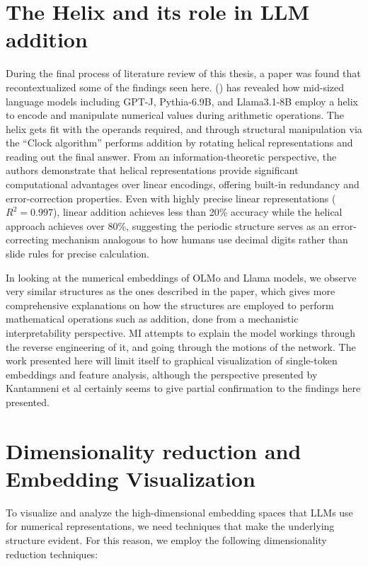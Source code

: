 \documentclass[
  a4paper, twoside, 10pt, titlepage]{book}
\begin{document}
\section{The Helix and its role in LLM
addition}\label{the-helix-and-its-role-in-llm-addition}

During the final process of literature review of this thesis, a paper
was found that recontextualized some of the findings seen here.
() has
revealed how mid-sized language models including GPT-J, Pythia-6.9B, and
Llama3.1-8B employ a helix to encode and manipulate numerical values
during arithmetic operations. The helix gets fit with the operands
required, and through structural manipulation via the ``Clock
algorithm'' performs addition by rotating helical representations and
reading out the final answer. From an information-theoretic perspective,
the authors demonstrate that helical representations provide significant
computational advantages over linear encodings, offering built-in
redundancy and error-correction properties. Even with highly precise
linear representations (\(R^2 = 0.997\)), linear addition achieves less
than 20\% accuracy while the helical approach achieves over 80\%,
suggesting the periodic structure serves as an error-correcting
mechanism analogous to how humans use decimal digits rather than slide
rules for precise calculation.

In looking at the numerical embeddings of OLMo and Llama models, we
observe very similar structures as the ones described in the paper,
which gives more comprehensive explanations on how the structures are
employed to perform mathematical operations such as addition, done from
a mechanistic interpretability perspective. MI attempts to explain the
model workings through the reverse engineering of it, and going through
the motions of the network. The work presented here will limit itself to
graphical visualization of single-token embeddings and feature analysis,
although the perspective presented by Kantamneni et al certainly seems
to give partial confirmation to the findings here presented.

\clearpage

\section{Dimensionality reduction and Embedding
Visualization}\label{dimensionality-reduction-and-embedding-visualization}

To visualize and analyze the high-dimensional embedding spaces that LLMs
use for numerical representations, we need techniques that make the
underlying structure evident. For this reason, we employ the following
dimensionality reduction techniques:
\end{document}
